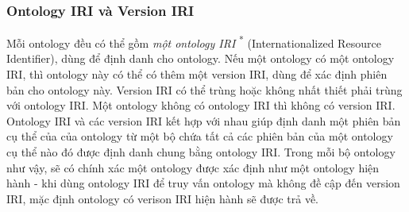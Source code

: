 \subsubsection{Ontology IRI và Version IRI}
Mỗi ontology đều có thể gồm \textit{một ontology IRI} \cite{iri} \textsuperscript{*} (Internationalized Resource Identifier), dùng để định danh cho ontology. Nếu một ontology có một ontology IRI, thì ontology này có thể có thêm một version IRI, dùng để xác định phiên bản cho ontology này. Version IRI có thể trùng hoặc không nhất thiết phải trùng với ontology IRI. Một ontology không có ontology IRI thì không có version IRI.
{\let\thefootnote\relax{}
}
\\
Ontology IRI và các version IRI kết hợp với nhau giúp định danh một phiên bản cụ thể của của ontology từ một bộ chứa tất cả các phiên bản của một ontology cụ thể nào đó được định danh chung bằng ontology IRI. Trong mỗi bộ ontology như vậy, sẽ có chính xác một ontology được xác định như một ontology hiện hành - khi dùng ontology IRI để truy vấn ontology mà không đề cập đến version IRI, mặc định ontology có verison IRI hiện hành sẽ được trả về.


